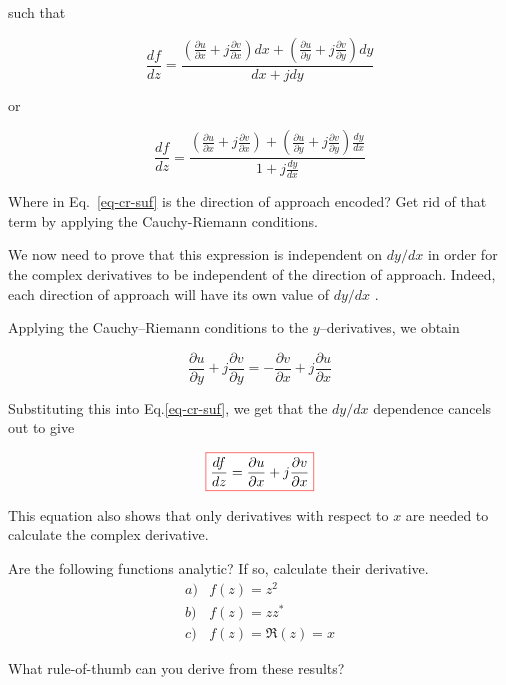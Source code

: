 such that

\begin{equation}
\frac{d f}{d z} = \frac{\left(\frac{\partial u}{\partial x}+j\frac{\partial v}{\partial x}\right) d x+\left(\frac{\partial u}{\partial y}+j\frac{\partial v}{\partial y}\right) d y}{d x + j d y}
\end{equation} 

or

\begin{equation}
\frac{d f}{d z} = \frac{\left(\frac{\partial u}{\partial x}+j\frac{\partial v}{\partial x}\right) +\left(\frac{\partial u}{\partial y}+j\frac{\partial v}{\partial y}\right) \frac{d y}{d x}}{1 + j \frac{d y}{d x}} \label{eq-cr-suf}
\end{equation} 

\begin{cue}
Where in Eq.~\ref{eq-cr-suf} is the direction of approach encoded? Get rid of that term by applying the Cauchy-Riemann conditions.
\end{cue}

We now need to prove that this expression is independent on $d y / d x$ in order for the complex derivatives to be independent of the direction of approach. Indeed, each direction of approach will have its own value of $d y / d x$ .

Applying the Cauchy--Riemann conditions to the $y$--derivatives, we obtain

\begin{equation}
\frac{\partial u}{\partial y}+j\frac{\partial v}{\partial y} = -\frac{\partial v}{\partial x}+j\frac{\partial u}{\partial x}
\end{equation}

Substituting this into Eq.\ref{eq-cr-suf}, we get that the $d y / d x$ dependence cancels out to give

\begin{equation}
\fbox{$\displaystyle
\frac{d f}{d z} = \frac{\partial u}{\partial x}+j\frac{\partial v}{\partial x}
$}
\end{equation} 

This equation also shows that only derivatives with respect to $x$ are needed to calculate the complex derivative.

\begin{exer}
Are the following functions analytic? If so, calculate their derivative.
$$\begin{array}{lcll}a) & f(z)=z^2 \\b) & f(z)=z z^* \\c) & f(z)= \Re(z)=x \end{array}$$

What rule-of-thumb can you derive from these results?
\end{exer}

